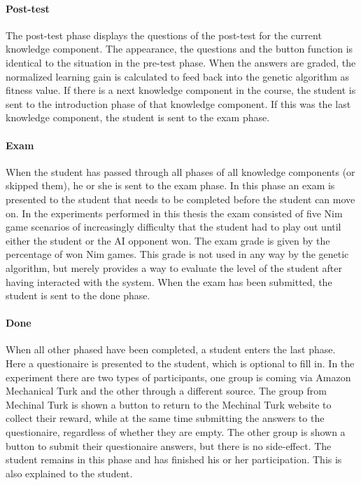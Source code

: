 \paragraph{Post-test} The post-test phase displays the questions of the
post-test for the current knowledge component. The appearance, the questions
and the button function is identical to the situation in the pre-test phase.
When the answers are graded, the normalized learning gain is calculated to
feed back into the genetic algorithm as fitness value. If there is a next
knowledge component in the course, the student is sent to the introduction
phase of that knowledge component. If this was the last knowledge component,
the student is sent to the exam phase.
\paragraph{Exam} When the student has passed through all phases of all
knowledge components (or skipped them), he or she is sent to the exam phase. In
this phase an exam is presented to the student that needs to be completed
before the student can move on. In the experiments performed in this thesis the
exam consisted of five Nim game scenarios of increasingly difficulty that the
student had to play out until either the student or the AI opponent won. The
exam grade is given by the percentage of won Nim games. This grade is not used
in any way by the genetic algorithm, but merely provides a way to evaluate the
level of the student after having interacted with the system. When the exam has
been submitted, the student is sent to the done phase.
\paragraph{Done} When all other phased have been completed, a student enters
the last phase. Here a questionaire is presented to the student, which is
optional to fill in. In the experiment there are two types of participants, one
group is coming via Amazon Mechanical Turk and the other through a different
source. The group from Mechinal Turk is shown a button to return to the
Mechinal Turk website to collect their reward, while at the same time
submitting the answers to the questionaire, regardless of whether they are
empty. The other group is shown a button to submit their questionaire answers,
but there is no side-effect. The student remains in this phase and has finished
his or her participation. This is also explained to the student.

